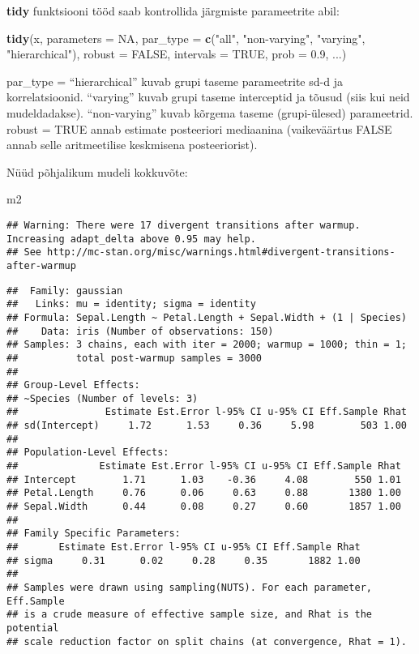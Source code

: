 \documentclass[]{article}
\newenvironment{Shaded}{\begin{snugshade}}{\end{snugshade}}
\newcommand{\KeywordTok}[1]{\textcolor[rgb]{0.13,0.29,0.53}{\textbf{#1}}}
\newcommand{\DataTypeTok}[1]{\textcolor[rgb]{0.13,0.29,0.53}{#1}}
\newcommand{\FloatTok}[1]{\textcolor[rgb]{0.00,0.00,0.81}{#1}}
\newcommand{\StringTok}[1]{\textcolor[rgb]{0.31,0.60,0.02}{#1}}
\newcommand{\OtherTok}[1]{\textcolor[rgb]{0.56,0.35,0.01}{#1}}
\newcommand{\NormalTok}[1]{#1}
\begin{document}
\textbf{tidy} funktsiooni tööd saab kontrollida järgmiste parameetrite
abil:

\begin{Shaded}
\begin{Highlighting}[]
\KeywordTok{tidy}\NormalTok{(x, }\DataTypeTok{parameters =} \OtherTok{NA}\NormalTok{, }\DataTypeTok{par_type =} \KeywordTok{c}\NormalTok{(}\StringTok{"all"}\NormalTok{,}
  \StringTok{"non-varying"}\NormalTok{, }\StringTok{"varying"}\NormalTok{, }\StringTok{"hierarchical"}\NormalTok{), }\DataTypeTok{robust =} \OtherTok{FALSE}\NormalTok{,}
  \DataTypeTok{intervals =} \OtherTok{TRUE}\NormalTok{, }\DataTypeTok{prob =} \FloatTok{0.9}\NormalTok{, ...)}
\end{Highlighting}
\end{Shaded}

par\_type = ``hierarchical'' kuvab grupi taseme parameetrite sd-d ja
korrelatsioonid. ``varying'' kuvab grupi taseme interceptid ja tõusud
(siis kui neid mudeldadakse). ``non-varying'' kuvab kõrgema taseme
(grupi-ülesed) parameetrid. robust = TRUE annab estimate posteeriori
mediaanina (vaikeväärtus FALSE annab selle aritmeetilise keskmisena
posteeriorist).

Nüüd põhjalikum mudeli kokkuvõte:

\begin{Shaded}
\begin{Highlighting}[]
\NormalTok{m2}
\end{Highlighting}
\end{Shaded}

\begin{verbatim}
## Warning: There were 17 divergent transitions after warmup. Increasing adapt_delta above 0.95 may help.
## See http://mc-stan.org/misc/warnings.html#divergent-transitions-after-warmup
\end{verbatim}

\begin{verbatim}
##  Family: gaussian 
##   Links: mu = identity; sigma = identity 
## Formula: Sepal.Length ~ Petal.Length + Sepal.Width + (1 | Species) 
##    Data: iris (Number of observations: 150) 
## Samples: 3 chains, each with iter = 2000; warmup = 1000; thin = 1;
##          total post-warmup samples = 3000
## 
## Group-Level Effects: 
## ~Species (Number of levels: 3) 
##               Estimate Est.Error l-95% CI u-95% CI Eff.Sample Rhat
## sd(Intercept)     1.72      1.53     0.36     5.98        503 1.00
## 
## Population-Level Effects: 
##              Estimate Est.Error l-95% CI u-95% CI Eff.Sample Rhat
## Intercept        1.71      1.03    -0.36     4.08        550 1.01
## Petal.Length     0.76      0.06     0.63     0.88       1380 1.00
## Sepal.Width      0.44      0.08     0.27     0.60       1857 1.00
## 
## Family Specific Parameters: 
##       Estimate Est.Error l-95% CI u-95% CI Eff.Sample Rhat
## sigma     0.31      0.02     0.28     0.35       1882 1.00
## 
## Samples were drawn using sampling(NUTS). For each parameter, Eff.Sample 
## is a crude measure of effective sample size, and Rhat is the potential 
## scale reduction factor on split chains (at convergence, Rhat = 1).
\end{verbatim}
\end{document}
